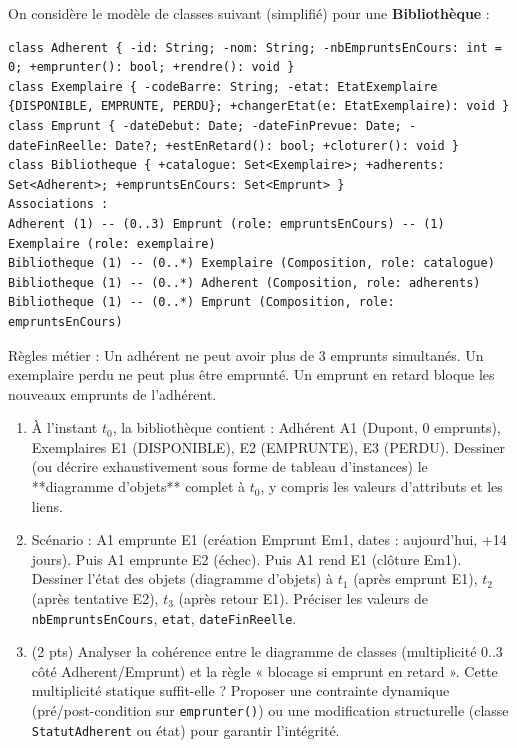 \documentclass[11pt]{article}
\begin{document}
\begin{exercice}
On considère le modèle de classes suivant (simplifié) pour une \textbf{Bibliothèque} :
\begin{verbatim}
class Adherent { -id: String; -nom: String; -nbEmpruntsEnCours: int = 0; +emprunter(): bool; +rendre(): void }
class Exemplaire { -codeBarre: String; -etat: EtatExemplaire {DISPONIBLE, EMPRUNTE, PERDU}; +changerEtat(e: EtatExemplaire): void }
class Emprunt { -dateDebut: Date; -dateFinPrevue: Date; -dateFinReelle: Date?; +estEnRetard(): bool; +cloturer(): void }
class Bibliotheque { +catalogue: Set<Exemplaire>; +adherents: Set<Adherent>; +empruntsEnCours: Set<Emprunt> }
Associations :
Adherent (1) -- (0..3) Emprunt (role: empruntsEnCours) -- (1) Exemplaire (role: exemplaire)
Bibliotheque (1) -- (0..*) Exemplaire (Composition, role: catalogue)
Bibliotheque (1) -- (0..*) Adherent (Composition, role: adherents)
Bibliotheque (1) -- (0..*) Emprunt (Composition, role: empruntsEnCours)
\end{verbatim}
Règles métier : Un adhérent ne peut avoir plus de 3 emprunts simultanés. Un exemplaire perdu ne peut plus être emprunté. Un emprunt en retard bloque les nouveaux emprunts de l'adhérent.
\begin{enumerate}
    \item À l'instant $t_0$, la bibliothèque contient : Adhérent A1 (Dupont, 0 emprunts), Exemplaires E1 (DISPONIBLE), E2 (EMPRUNTE), E3 (PERDU). Dessiner (ou décrire exhaustivement sous forme de tableau d'instances) le **diagramme d'objets** complet à $t_0$, y compris les valeurs d'attributs et les liens.
    \item Scénario : A1 emprunte E1 (création Emprunt Em1, dates : aujourd'hui, +14 jours). Puis A1 emprunte E2 (échec). Puis A1 rend E1 (clôture Em1). Dessiner l'état des objets (diagramme d'objets) à $t_1$ (après emprunt E1), $t_2$ (après tentative E2), $t_3$ (après retour E1). Préciser les valeurs de \texttt{nbEmpruntsEnCours}, \texttt{etat}, \texttt{dateFinReelle}.
    \item (2 pts) Analyser la cohérence entre le diagramme de classes (multiplicité 0..3 côté Adherent/Emprunt) et la règle « blocage si emprunt en retard ». Cette multiplicité statique suffit-elle ? Proposer une contrainte dynamique (pré/post-condition sur \texttt{emprunter()}) ou une modification structurelle (classe \texttt{StatutAdherent} ou état) pour garantir l'intégrité.
\end{enumerate}
\end{exercice}
\end{document}
